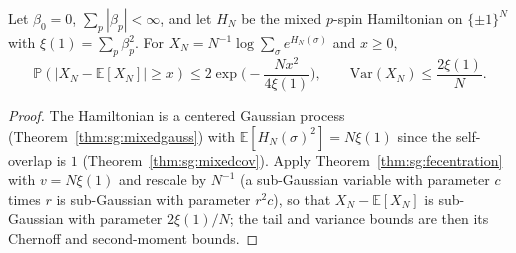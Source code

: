 \begin{theorem}\label{thm:sg:mixedconc}
  \leanok
Let $\beta_0=0$, $\sum_p|\beta_p|<\infty$, and let $H_N$ be the mixed $p$-spin Hamiltonian on $\{\pm1\}^N$ with $\xi(1)=\sum_p\beta_p^2$. For
$X_N=N^{-1}\log\sum_\sigma e^{H_N(\sigma)}$ and $x\ge0$,
\[\mathbb P(|X_N-\mathbb E[X_N]|\ge x)\le2\exp\Big(-\frac{Nx^2}{4\xi(1)}\Big),\qquad\mathrm{Var}(X_N)\le\frac{2\xi(1)}N.\]
\end{theorem}

\begin{proof}
  \leanok
The Hamiltonian is a centered Gaussian process (Theorem~\ref{thm:sg:mixedgauss}) with $\mathbb E[H_N(\sigma)^2]=N\xi(1)$ since the self-overlap is $1$
(Theorem~\ref{thm:sg:mixedcov}). Apply Theorem~\ref{thm:sg:fecentration} with $v=N\xi(1)$ and rescale by $N^{-1}$ (a sub-Gaussian variable with parameter $c$ times $r$ is sub-Gaussian with parameter $r^2c$), so that $X_N-\mathbb E[X_N]$ is sub-Gaussian with parameter $2\xi(1)/N$; the tail and variance bounds are then its Chernoff and second-moment bounds.
\end{proof}

